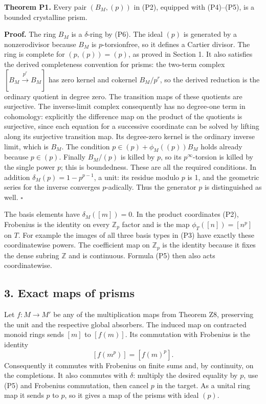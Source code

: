\documentclass[
]{article}
\begin{document}
\textbf{Theorem P1.} Every pair \((B_M,(p))\) in (P2), equipped with
(P4)--(P5), is a bounded crystalline prism.

\textbf{Proof.} The ring \(B_M\) is a \(\delta\)-ring by (P6). The ideal
\((p)\) is generated by a nonzerodivisor because \(B_M\) is
\(p\)-torsionfree, so it defines a Cartier divisor. The ring is complete
for \((p,(p))=(p)\), as proved in Section 1. It also satisfies the
derived completeness convention for prisms: the two-term complex
\([B_M\xrightarrow{p^r}B_M]\) has zero kernel and cokernel \(B_M/p^r\),
so the derived reduction is the ordinary quotient in degree zero. The
transition maps of these quotients are surjective. The inverse-limit
complex consequently has no degree-one term in cohomology: explicitly
the difference map on the product of the quotients is surjective, since
each equation for a successive coordinate can be solved by lifting along
its surjective transition map. Its degree-zero kernel is the ordinary
inverse limit, which is \(B_M\). The condition
\(p\in(p)+\phi_M((p))B_M\) holds already because \(p\in(p)\). Finally
\(B_M/(p)\) is killed by \(p\), so its \(p^\infty\)-torsion is killed by
the single power \(p\); this is boundedness. These are all the required
conditions. In addition \(\delta_M(p)=1-p^{p-1}\), a unit: its residue
modulo \(p\) is 1, and the geometric series for the inverse converges
\(p\)-adically. Thus the generator \(p\) is distinguished as well.
\(\square\)

The basis elements have \(\delta_M([m])=0\). In the product coordinates
(P2), Frobenius is the identity on every \(\mathbb Z_p\) factor and is
the map \(\phi_T([n])=[n^p]\) on \(T\). For example the images of all
three basis types in (P3) have exactly these coordinatewise powers. The
coefficient map on \(\mathbb Z_p\) is the identity because it fixes the
dense subring \(\mathbb Z\) and is continuous. Formula (P5) then also
acts coordinatewise.

\subsection{3. Exact maps of prisms}\label{exact-maps-of-prisms}

Let \(f:M\to M'\) be any of the multiplication maps from Theorem Z8,
preserving the unit and the respective global absorbers. The induced map
on contracted monoid rings sends \([m]\) to \([f(m)]\). Its commutation
with Frobenius is the identity \[
[f(m^p)]=[f(m)^p].
\tag{P7}
\] Consequently it commutes with Frobenius on finite sums and, by
continuity, on the completions. It also commutes with \(\delta\):
multiply the desired equality by \(p\), use (P5) and Frobenius
commutation, then cancel \(p\) in the target. As a unital ring map it
sends \(p\) to \(p\), so it gives a map of the prisms with ideal
\((p)\).
\end{document}
